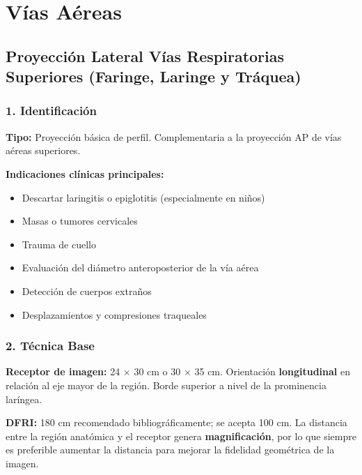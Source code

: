 	
	\section{Vías Aéreas}
	
	\subsection{Proyección Lateral Vías Respiratorias Superiores (Faringe, Laringe y Tráquea)}
	
	\subsubsection*{1. Identificación}
	
	\textbf{Tipo:} Proyección básica de perfil. Complementaria a la proyección AP de vías aéreas superiores.
	
	\textbf{Indicaciones clínicas principales:}
	\begin{itemize}
		\item Descartar laringitis o epiglotitis (especialmente en niños)
		\item Masas o tumores cervicales
		\item Trauma de cuello
		\item Evaluación del diámetro anteroposterior de la vía aérea
		\item Detección de cuerpos extraños
		\item Desplazamientos y compresiones traqueales
	\end{itemize}
	
	\subsubsection*{2. Técnica Base}
	
	\textbf{Receptor de imagen:} 24 $\times$ 30 cm o 30 $\times$ 35 cm. Orientación \textbf{longitudinal} en relación al eje mayor de la región. Borde superior a nivel de la prominencia laríngea.
	
	\textbf{DFRI:} 180 cm recomendado bibliográficamente; se acepta 100 cm. La distancia entre la región anatómica y el receptor genera \textbf{magnificación}, por lo que siempre es preferible aumentar la distancia para mejorar la fidelidad geométrica de la imagen.
	
